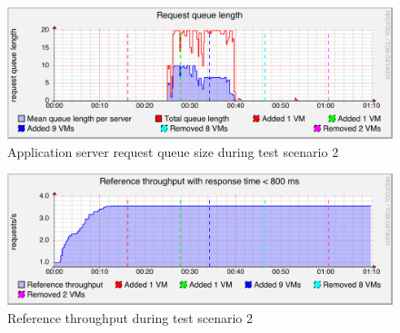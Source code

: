 \documentclass[english]{tktltiki2}
\theoremstyle{definition}
\theoremstyle{remark}
\begin{document}
\begin{figure}[htbp]
	\includegraphics[width=\textwidth]{images/queuesizegraph-test23}
	\caption{Application server request queue size during test scenario 2}
	\label{fig:queueScenario2}
\end{figure}

\begin{figure}[htbp]
	\includegraphics[width=\textwidth]{images/referencethroughputgraph-test23}
	\caption{Reference throughput during test scenario 2}
	\label{fig:referenceThroughputScenario2}
\end{figure}

\clearpage

%
%
% 
%




\end{document}
